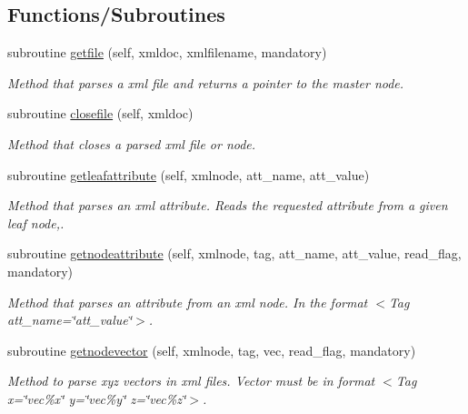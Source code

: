 \subsection*{Functions/\+Subroutines}
\begin{DoxyCompactItemize}
\item 
subroutine \mbox{\hyperlink{namespacexmlparser__mod_af7265285af04ac926f946c2989ed85b4}{getfile}} (self, xmldoc, xmlfilename, mandatory)
\begin{DoxyCompactList}\small\item\em Method that parses a xml file and returns a pointer to the master node. \end{DoxyCompactList}\item 
subroutine \mbox{\hyperlink{namespacexmlparser__mod_a9eed98475e0d55a3c7b2eeb88925a48c}{closefile}} (self, xmldoc)
\begin{DoxyCompactList}\small\item\em Method that closes a parsed xml file or node. \end{DoxyCompactList}\item 
subroutine \mbox{\hyperlink{namespacexmlparser__mod_a3e977c7792b08b009a09cc1f7fb4f80a}{getleafattribute}} (self, xmlnode, att\+\_\+name, att\+\_\+value)
\begin{DoxyCompactList}\small\item\em Method that parses an xml attribute. Reads the requested attribute from a given leaf node,. \end{DoxyCompactList}\item 
subroutine \mbox{\hyperlink{namespacexmlparser__mod_ade14a3d90326f84cfa52844aa4a16b75}{getnodeattribute}} (self, xmlnode, tag, att\+\_\+name, att\+\_\+value, read\+\_\+flag, mandatory)
\begin{DoxyCompactList}\small\item\em Method that parses an attribute from an xml node. In the format \textquotesingle{}$<$\+Tag att\+\_\+name=\char`\"{}att\+\_\+value\char`\"{}$>$\textquotesingle{}. \end{DoxyCompactList}\item 
subroutine \mbox{\hyperlink{namespacexmlparser__mod_a0c2ac0513cee4e660e07cb083a790a53}{getnodevector}} (self, xmlnode, tag, vec, read\+\_\+flag, mandatory)
\begin{DoxyCompactList}\small\item\em Method to parse xyz vectors in xml files. Vector must be in format \textquotesingle{}$<$\+Tag x=\char`\"{}vec\%x\char`\"{} y=\char`\"{}vec\%y\char`\"{} z=\char`\"{}vec\%z\char`\"{}$>$\textquotesingle{}. \end{DoxyCompactList}\item 

\end{DoxyCompactItemize}
